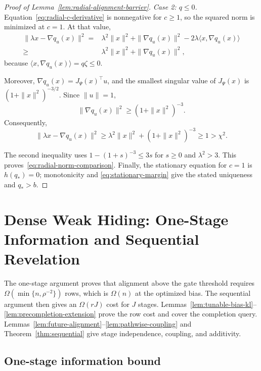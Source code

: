 \documentclass{article}
\theoremstyle{definition}
\begin{document}
\begin{proof}[Proof of Lemma~\ref{lem:radial-alignment-barrier}]
\emph{Case 2: $q\le0$.}
Equation~\eqref{eq:radial-c-derivative} is nonnegative for $c\ge1$,
so the squared norm is minimized at $c=1$.  At that value,
\begin{equation}
\begin{aligned}
 \|\lambda x-\nabla q_u(x)\|^2
 ={}&\lambda^2\|x\|^2+\|\nabla q_u(x)\|^2
 -2\lambda\langle x,\nabla q_u(x)\rangle\\
 \ge{}&\lambda^2\|x\|^2+\|\nabla q_u(x)\|^2,
\end{aligned}
\end{equation}
because $\langle x,\nabla q_u(x)\rangle=q\zeta\le0$.

Moreover, $\nabla q_u(x)=J_\Psi(x)^\top u$, and the smallest singular value
of $J_\Psi(x)$ is $(1+\|x\|^2)^{-3/2}$.  Since $\|u\|=1$,
\begin{equation}
 \|\nabla q_u(x)\|^2\ge(1+\|x\|^2)^{-3}.
\end{equation}
Consequently,
\begin{equation}
 \|\lambda x-\nabla q_u(x)\|^2
 \ge\lambda^2\|x\|^2+(1+\|x\|^2)^{-3}
 \ge1>\chi^2.
\end{equation}

The second inequality uses $1-(1+s)^{-3}\le3s$ for $s\ge0$ and
$\lambda^2>3$.  This proves~\eqref{eq:radial-norm-comparison}.  Finally,
the stationary equation for $c=1$ is $h(q_*)=0$; monotonicity and
\eqref{eq:stationary-margin} give the stated uniqueness and $q_*>b$.
\end{proof}

\clearpage
\section{Dense Weak Hiding: One-Stage Information and Sequential Revelation}
\label{app:information}

The one-stage argument proves that alignment above the gate threshold requires
$\Omega(\min\{n,\rho^{-2}\})$ rows, which is $\Omega(n)$ at the optimized
bias.  The sequential argument then gives an $\Omega(rJ)$ cost for
$J$ stages.  Lemmas~\ref{lem:tunable-bias-kl}--%
\ref{lem:precompletion-extension} prove the row cost and cover the completion
query.  Lemmas~\ref{lem:future-alignment}--\ref{lem:pathwise-coupling} and
Theorem~\ref{thm:sequential} give stage independence, coupling, and additivity.

\subsection{One-stage information bound}
\end{document}
